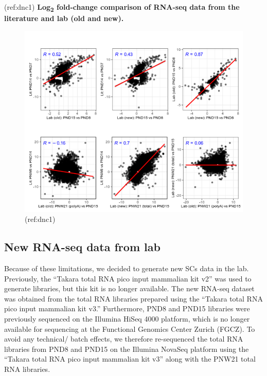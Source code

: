 \documentclass[12pt,twoside]{reedthesis}
\begin{document}
(ref:dnc1)
\textbf{Log\textsubscript{2} fold-change comparison of RNA-seq data from the literature and lab (old and new).}


\begin{figure}[h]

{\centering \includegraphics{thesis_files/figure-latex/dn1-1} 

}

\caption[Log\textsubscript{2} fold-change comparison of RNA-seq data
from the literature and lab (old and new)]{(ref:dnc1)}\label{fig:dn1}
\end{figure}
\hypertarget{new-rna-seq-data-from-lab}{%
\subsection{New RNA-seq data from lab}\label{new-rna-seq-data-from-lab}}

Because of these limitations, we decided to generate new SCs data in the
lab. Previously, the ``Takara total RNA pico input mammalian kit v2'' was
used to generate libraries, but this kit is no longer available. The new
RNA-seq dataset was obtained from the total RNA libraries prepared using
the ``Takara total RNA pico input mammalian kit v3.'' Furthermore, PND8
and PND15 libraries were previously sequenced on the Illumina HiSeq 4000
platform, which is no longer available for sequencing at the Functional
Genomics Center Zurich (FGCZ). To avoid any technical/ batch effects, we
therefore re-sequenced the total RNA libraries from PND8 and PND15 on
the Illumina NovaSeq platform using the ``Takara total RNA pico input
mammalian kit v3'' along with the PNW21 total RNA libraries.
\end{document}
